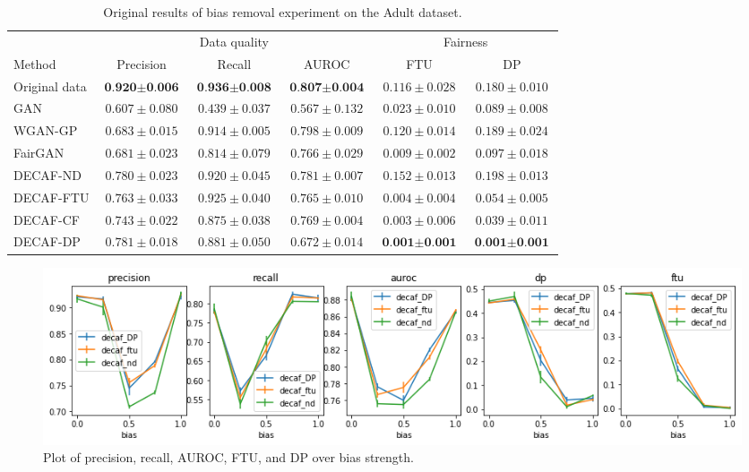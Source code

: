 \begin{table}[]
\small\addtolength{\tabcolsep}{-0.2pt}
\caption{Original results of bias removal experiment on the Adult dataset.}
\label{tab:paper_table}
\begin{tabular}{l|ccccc}
\hline
                & \multicolumn{3}{c}{Data quality}                             & \multicolumn{2}{c}{Fairness} \\ \cline{2-6} 
Method          & Precision   & Recall      & \multicolumn{1}{c|}{AUROC}       & FTU           & DP           \\ \hline
Original data & $\textbf{0.920$\pm$0.006}$ & $\textbf{0.936$\pm$0.008}$ & \multicolumn{1}{c|}{$\textbf{0.807$\pm$0.004}$} & $0.116\pm0.028$   & $0.180\pm0.010$  \\
GAN             & $0.607\pm0.080$ & $0.439\pm0.037$ & \multicolumn{1}{c|}{$0.567\pm0.132$} & $0.023\pm0.010$   & $0.089\pm0.008$  \\
WGAN-GP         & $0.683\pm0.015$ & $0.914\pm0.005$ & \multicolumn{1}{c|}{$0.798\pm0.009$} & $0.120\pm0.014$   & $0.189\pm0.024$  \\
FairGAN         & $0.681\pm0.023$ & $0.814\pm0.079$ & \multicolumn{1}{c|}{$0.766\pm0.029$} & $0.009\pm0.002$   & $0.097\pm0.018$  \\
DECAF-ND        & $0.780\pm0.023$ & $0.920\pm0.045$ & \multicolumn{1}{c|}{$0.781\pm0.007$} & $0.152\pm0.013$   & $0.198\pm0.013$  \\
DECAF-FTU       & $0.763\pm0.033$ & $0.925\pm0.040$ & \multicolumn{1}{c|}{$0.765\pm0.010$} & $0.004\pm0.004$   & $0.054\pm0.005$  \\
DECAF-CF        & $0.743\pm0.022$ & $0.875\pm0.038$ & \multicolumn{1}{c|}{$0.769\pm0.004$} & $0.003\pm0.006$   & $0.039\pm0.011$  \\
DECAF-DP        & $0.781\pm0.018$ & $0.881\pm0.050$ & \multicolumn{1}{c|}{$0.672\pm0.014$} & $\textbf{0.001$\pm$0.001}$   & $\textbf{0.001$\pm$0.001}$
\end{tabular}
\end{table}

\begin{figure}[h]
  \centering
  \includegraphics[width=\linewidth]{../openreview/images/experiment_2.png}
  \caption{Plot of precision, recall, AUROC, FTU, and DP over bias strength.}
  \label{fig:exp2}
\end{figure}

